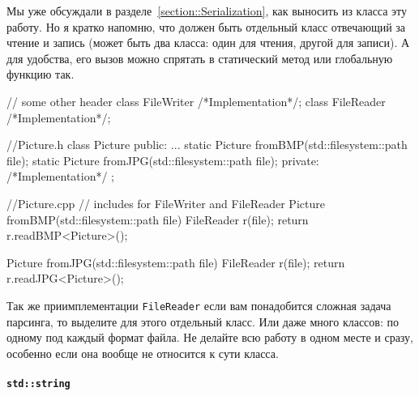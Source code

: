 Мы уже обсуждали в разделе~\ref{section::Serialization}, как выносить из класса эту работу.
Но я кратко напомню, что должен быть отдельный класс отвечающий за чтение и запись (может быть два класса: один для чтения, другой для записи).
А для удобства, его вызов можно спрятать в статический метод или глобальную функцию так.
\begin{cppcode}
// some other header
class FileWriter {/*Implementation*/};
class FileReader {/*Implementation*/};

//Picture.h
class Picture {
public:
  ...
  static Picture fromBMP(std::filesystem::path file);
  static Picture fromJPG(std::filesystem::path file);
private:
  /*Implementation*/
};

//Picture.cpp
// includes for FileWriter and FileReader
Picture fromBMP(std::filesystem::path file) {
  FileReader r(file);
  return r.readBMP<Picture>();
}

Picture fromJPG(std::filesystem::path file) {
  FileReader r(file);
  return r.readJPG<Picture>();
}
\end{cppcode}
Так же приимплементации \verb"FileReader" если вам понадобится сложная задача парсинга, то выделите для этого отдельный класс.
Или даже много классов: по одному под каждый формат файла.
Не делайте всю работу в одном месте и сразу, особенно если она вообще не относится к сути класса.

\paragraph{\texttt{std::string}}

